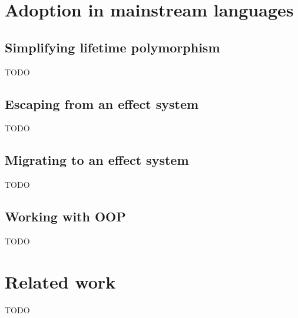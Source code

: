 \documentclass[acmsmall]{acmart}
\begin{document}


\section{Adoption in mainstream languages} \label{sec:mainstream}


\subsection{Simplifying lifetime polymorphism} \label{subsec:lifetime-elision}


TODO %

\subsection{Escaping from an effect system}



TODO %

\subsection{Migrating to an effect system}

TODO %

\subsection{Working with OOP}

TODO %


\section{Related work} \label{sec:related}



TODO %

\end{document}
